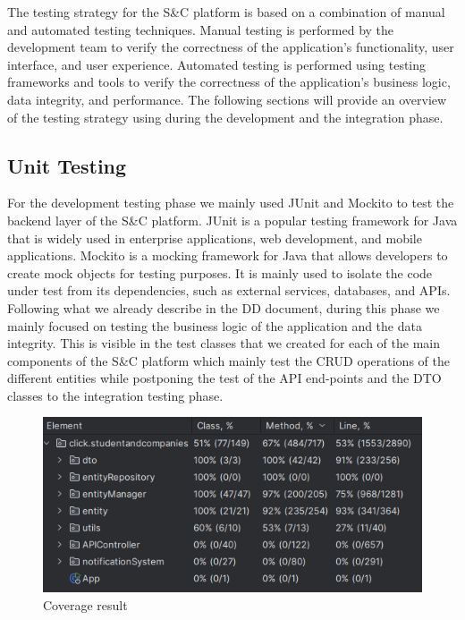 The testing strategy for the S\&C platform is based on a combination of manual and automated testing techniques. Manual testing is performed by the development team to verify the correctness of the application's functionality, user interface, and user experience. Automated testing is performed using testing frameworks and tools to verify the correctness of the application's business logic, data integrity, and performance. The following sections will provide an overview of the testing strategy using during the development and the integration phase.
\subsection{Unit Testing}
For the development testing phase we mainly used JUnit and Mockito to test the backend layer of the S\&C platform. JUnit is a popular testing framework for Java that is widely used in enterprise applications, web development, and mobile applications. Mockito is a mocking framework for Java that allows developers to create mock objects for testing purposes. It is mainly used to isolate the code under test from its dependencies, such as external services, databases, and APIs.\\
Following what we already describe in the DD document, during this phase we mainly focused on testing the business logic of the application and the data integrity. This is visible in the test classes that we created for each of the main components of the S\&C platform which mainly test the CRUD operations of the different entities while postponing the test of the API end-points and the DTO classes to the integration testing phase. 

\begin{figure}[H]
    \centering
    \includegraphics[width=0.5\linewidth]{Latex/Images/ITD/Coverage.png}
    \caption{Coverage result}
    \label{fig:coverage}
\end{figure}

